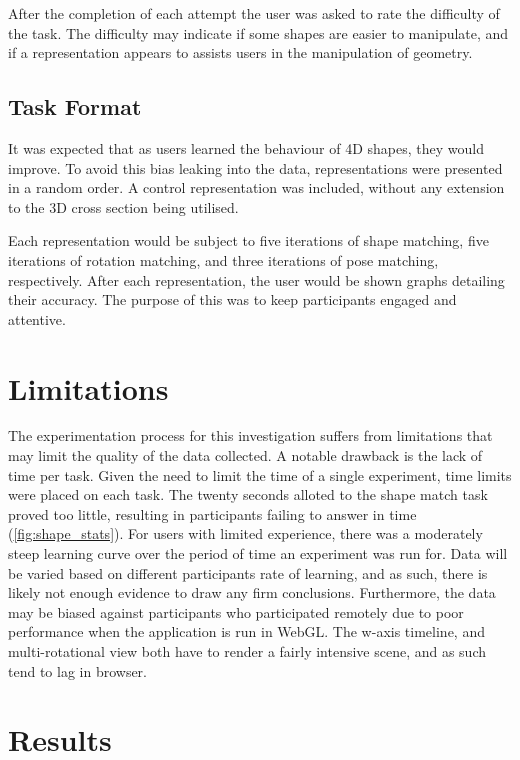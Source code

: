 \documentclass{l4proj}
\begin{document}
After the completion of each attempt the user was asked to rate the difficulty of the task. The difficulty may indicate if some shapes are easier to manipulate, and if a representation appears to assists users in the manipulation of geometry.

\subsection{Task Format}

It was expected that as users learned the behaviour of 4D shapes, they would improve. To avoid this bias leaking into the data, representations were presented in a random order. A control representation was included, without any extension to the 3D cross section being utilised.

Each representation would be subject to five iterations of shape matching, five iterations of rotation matching, and three iterations of pose matching, respectively.
After each representation, the user would be shown graphs detailing their accuracy. The purpose of this was to keep participants engaged and attentive.

\section{Limitations}
\label{limiations}

The experimentation process for this investigation suffers from limitations that may limit the quality of the data collected. 
A notable drawback is the lack of time per task. Given the need to limit the time of a single experiment, time limits were placed on each task. The twenty seconds alloted to the shape match task proved too little, resulting in participants failing to answer in time (\cref{fig:shape_stats}). 
For users with limited experience, there was a moderately steep learning curve over the period of time an experiment was run for. Data will be varied based on different participants rate of learning, and as such, there is likely not enough evidence to draw any firm conclusions.
Furthermore, the data may be biased against participants who participated remotely due to poor performance when the application is run in WebGL. The w-axis timeline, and multi-rotational view both have to render a fairly intensive scene, and as such tend to lag in browser.

\section{Results}
\end{document}
